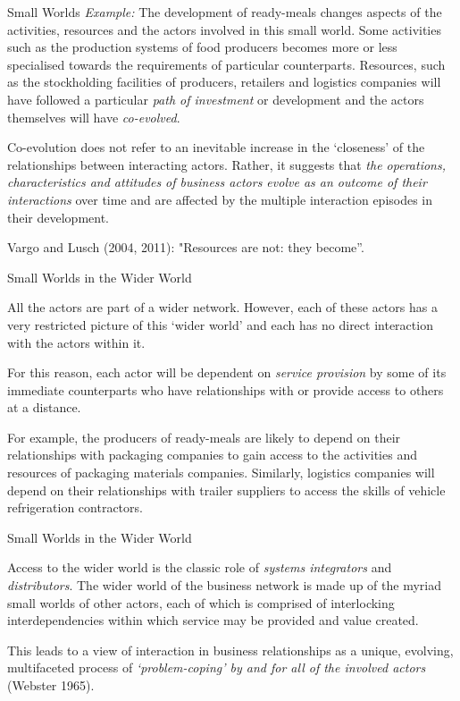 \documentclass{beamer}
\begin{document}
\begin{frame}{Small Worlds}
\emph{Example:} The development of ready-meals changes aspects of the
activities, resources and the actors involved in this small world. Some
activities such as the production systems of food producers becomes more or
less specialised towards the requirements of particular counterparts.
Resources, such as the stockholding facilities of producers, retailers and
logistics companies will have followed a particular \emph{path of investment}
or development and the actors themselves will have \emph{co-evolved}.

Co-evolution does not refer to an inevitable increase in the ‘closeness’ of
the relationships between interacting actors. Rather, it suggests that
\emph{the operations, characteristics and attitudes of business actors evolve
  as an outcome of their interactions} over time and are affected by the
multiple interaction episodes in their development.

Vargo and Lusch (2004, 2011): "Resources are not: they become”.

\end{frame}

\begin{frame}{Small Worlds in the Wider World}

All the actors are part of a wider network. However, each of these actors has
a very restricted picture of this ‘wider world’ and each has no direct
interaction with the actors within it.

For this reason, each actor will be dependent on \emph{service provision} by
some of its immediate counterparts who have relationships with or provide
access to others at a distance.

For example, the producers of ready-meals are likely to depend on their
relationships with packaging companies to gain access to the activities and
resources of packaging materials companies. Similarly, logistics companies
will depend on their relationships with trailer suppliers to access the skills
of vehicle refrigeration contractors.

\end{frame}

\begin{frame}{Small Worlds in the Wider World}

Access to the wider world is the classic role of \emph{systems integrators}
and \emph{distributors}. The wider world of the business network is made up of
the myriad small worlds of other actors, each of which is comprised of
interlocking interdependencies within which service may be provided and value
created.

This leads to a view of interaction in business relationships as a unique,
evolving, multifaceted process of \emph{‘problem-coping’ by and for all of the
  involved actors} (Webster 1965).
  
\end{frame}
  
  
\end{document}
